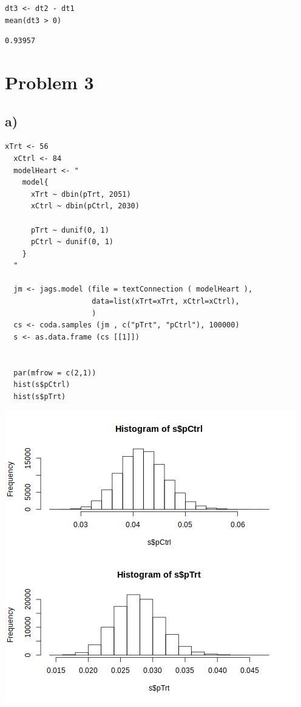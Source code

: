 \documentclass[11pt]{article}
\begin{document}
\begin{verbatim}
dt3 <- dt2 - dt1
mean(dt3 > 0)
\end{verbatim}

\begin{verbatim}
0.93957
\end{verbatim}

\section*{Problem 3}
\label{sec:org119b9d3}
\subsection*{a)}
\label{sec:org0265e16}
\begin{verbatim}
xTrt <- 56
  xCtrl <- 84
  modelHeart <- "
    model{
      xTrt ~ dbin(pTrt, 2051)
      xCtrl ~ dbin(pCtrl, 2030)

      pTrt ~ dunif(0, 1)
      pCtrl ~ dunif(0, 1)
    }
  "

  jm <- jags.model (file = textConnection ( modelHeart ),
                    data=list(xTrt=xTrt, xCtrl=xCtrl),
                    )
  cs <- coda.samples (jm , c("pTrt", "pCtrl"), 100000)
  s <- as.data.frame (cs [[1]])


  par(mfrow = c(2,1))
  hist(s$pCtrl)
  hist(s$pTrt)
\end{verbatim}

\begin{center}
\includegraphics[width=.9\linewidth]{fig1.png}
\end{center}
\end{document}

